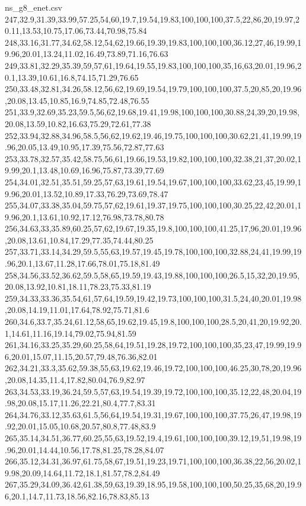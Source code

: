 \begin{filecontents*}[overwrite]{ns_g8_enet.csv}
247,32.9,31.39,33.99,57.25,54,60,19.7,19.54,19.83,100,100,100,37.5,22,86,20,19.97,20.11,13.53,10.75,17.06,73.44,70.98,75.84
248,33.16,31.77,34.62,58.12,54,62,19.66,19.39,19.83,100,100,100,36.12,27,46,19.99,19.96,20.01,13.24,11.02,16.49,73.89,71.16,76.63
249,33.81,32.29,35.39,59,57,61,19.64,19.55,19.83,100,100,100,35,16,63,20.01,19.96,20.1,13.39,10.61,16.8,74.15,71.29,76.65
250,33.48,32.81,34.26,58.12,56,62,19.69,19.54,19.79,100,100,100,37.5,20,85,20,19.96,20.08,13.45,10.85,16.9,74.85,72.48,76.55
251,33.9,32.69,35.23,59.5,56,62,19.68,19.41,19.98,100,100,100,30.88,24,39,20,19.98,20.08,13.59,10.82,16.63,75.29,72.61,77.38
252,33.94,32.88,34.96,58.5,56,62,19.62,19.46,19.75,100,100,100,30.62,21,41,19.99,19.96,20.05,13.49,10.95,17.39,75.56,72.87,77.63
253,33.78,32.57,35.42,58.75,56,61,19.66,19.53,19.82,100,100,100,32.38,21,37,20.02,19.99,20.1,13.48,10.69,16.96,75.87,73.39,77.69
254,34.01,32.51,35.51,59.25,57,63,19.61,19.54,19.67,100,100,100,33.62,23,45,19.99,19.96,20.01,13.52,10.89,17.33,76.29,73.69,78.47
255,34.07,33.38,35.04,59.75,57,62,19.61,19.37,19.75,100,100,100,30.25,22,42,20.01,19.96,20.1,13.61,10.92,17.12,76.98,73.78,80.78
256,34.63,33,35.89,60.25,57,62,19.67,19.35,19.8,100,100,100,41.25,17,96,20.01,19.96,20.08,13.61,10.84,17.29,77.35,74.44,80.25
257,33.71,33.14,34.29,59.5,55,63,19.57,19.45,19.78,100,100,100,32.88,24,41,19.99,19.96,20.1,13.67,11.28,17.66,78.01,75.18,81.49
258,34.56,33.52,36.62,59.5,58,65,19.59,19.43,19.88,100,100,100,26.5,15,32,20,19.95,20.08,13.92,10.81,18.11,78.23,75.33,81.19
259,34.33,33.36,35.54,61,57,64,19.59,19.42,19.73,100,100,100,31.5,24,40,20.01,19.98,20.08,14.19,11.01,17.64,78.92,75.71,81.6
260,34.6,33.7,35.24,61.12,58,65,19.62,19.45,19.8,100,100,100,28.5,20,41,20,19.92,20.1,14.61,11.16,19.14,79.02,75.94,81.59
261,34.16,33.25,35.29,60.25,58,64,19.51,19.28,19.72,100,100,100,35,23,47,19.99,19.96,20.01,15.07,11.15,20.57,79.48,76.36,82.01
262,34.21,33.3,35.62,59.38,55,63,19.62,19.46,19.72,100,100,100,46.25,30,78,20,19.96,20.08,14.35,11.4,17.82,80.04,76.9,82.97
263,34.53,33.19,36.24,59.5,57,63,19.54,19.39,19.72,100,100,100,35.12,22,48,20.04,19.98,20.08,15.17,11.26,22.21,80.4,77.7,83.31
264,34.76,33.12,35.63,61.5,56,64,19.54,19.31,19.67,100,100,100,37.75,26,47,19.98,19.92,20.01,15.05,10.68,20.57,80.8,77.48,83.9
265,35.14,34.51,36.77,60.25,55,63,19.52,19.4,19.61,100,100,100,39.12,19,51,19.98,19.96,20.01,14.44,10.56,17.78,81.25,78.28,84.07
266,35.12,34.31,36.97,61.75,58,67,19.51,19.23,19.71,100,100,100,36.38,22,56,20.02,19.98,20.09,14.64,11.72,18.1,81.57,78.2,84.49
267,35.29,34.09,36.42,61.38,59,63,19.39,18.95,19.58,100,100,100,50.25,35,68,20,19.96,20.1,14.7,11.73,18.56,82.16,78.83,85.13

\end{filecontents*}
